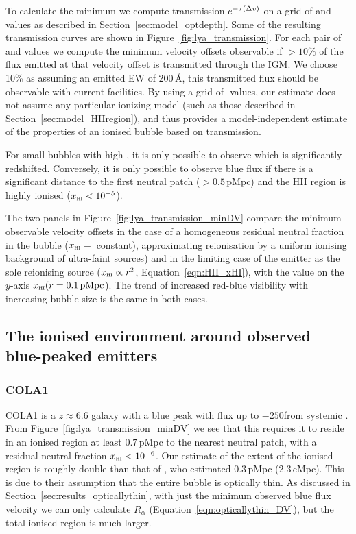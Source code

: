 \documentclass[fleqn,usenatbib]{mnras}
\begin{document}
To calculate the minimum \DV we compute \lya transmission $e^{-\tau(\DV)}$ on a grid of \Rion and \xHI values as described in Section~\ref{sec:model_optdepth}. Some of the resulting transmission curves are shown in Figure~\ref{fig:lya_transmission}. For each pair of \Rion and \xHI values we compute the minimum velocity offsets observable if $>10\%$ of the flux emitted at that velocity offset is transmitted through the IGM. We choose 10\% as assuming an emitted \lya EW of 200\,\AA, this transmitted flux should be observable with current facilities. By using a grid of \Rion-\xHI values, our estimate does not assume any particular ionizing model (such as those described in Section~\ref{sec:model_HIIregion}), and thus provides a model-independent estimate of the properties of an ionised bubble based on \lya transmission.

For small bubbles with high \xHI, it is only possible to observe \lya which is significantly redshifted. Conversely, it is only possible to observe blue \lya flux if there is a significant distance to the first neutral patch ($>0.5$\,pMpc) and the HII region is highly ionised ($\xHI<10^{-5}$).

The two panels in Figure~\ref{fig:lya_transmission_minDV} compare the minimum observable \lya velocity offsets in the case of a homogeneous residual neutral fraction in the bubble ($\xHI =$\, constant), approximating reionisation by a uniform ionising background of ultra-faint sources) and in the limiting case of the \lya emitter as the sole reionising source ($\xHI \propto r^2$, Equation~\ref{eqn:HII_xHI}), with the value on the $y$-axis $\xHI(r=0.1\,\mathrm{pMpc}$). The trend of increased red-blue visibility with increasing bubble size is the same in both cases.

\subsection{The ionised environment around observed blue-peaked \lya emitters}
\label{sec:results_obs}

\subsubsection{COLA1}
\label{sec:results_obs_COLA1}

COLA1 is a $z \approx 6.6$ galaxy with a blue \lya peak with flux up to $-250$\kms from systemic \citep{Hu2016,Matthee2018b}. From Figure~\ref{fig:lya_transmission_minDV} we see that this requires it to reside in an ionised region at least $0.7$\,pMpc to the nearest neutral patch, with a residual neutral fraction $\xHI < 10^{-6}$. Our estimate of the extent of the ionised region is roughly double than that of \citet{Matthee2018b}, who estimated 0.3\,pMpc (2.3\,cMpc). This is due to their assumption that the entire bubble is optically thin. As discussed in Section~\ref{sec:results_opticallythin}, with just the minimum observed blue flux velocity we can only calculate $R_\alpha$ (Equation~\ref{eqn:opticallythin_DV}), but the total ionised region is much larger.
\end{document}
